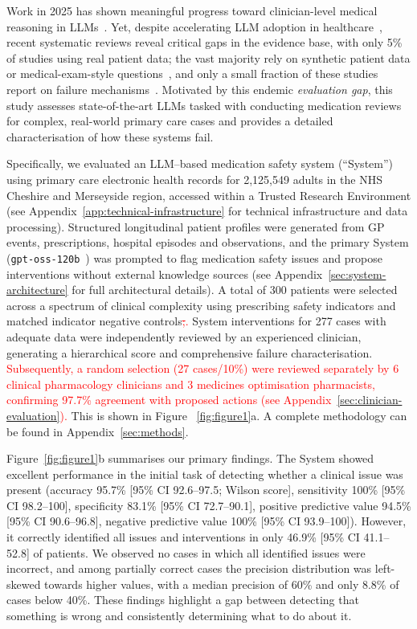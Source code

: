 \documentclass[12pt]{article}
\newcommand{\added}[1]{\textcolor{red}{#1}}
\newcommand{\removed}[1]{\textcolor{red}{\sout{#1}}}
\begin{document}
Work in 2025 has shown meaningful progress toward clinician-level medical reasoning in LLMs~\cite{Tu2025AMIE,Arora2025HealthBench, Chen2025GPT4}. Yet, despite accelerating LLM adoption in healthcare~\cite{elsevier_clinician_future_2025}, recent systematic reviews reveal critical gaps in the evidence base, with only 5\% of studies using real patient data; the vast majority rely on synthetic patient data or medical-exam-style questions~\cite{suhana2025, ong2025scoping}, and only a small fraction of these studies report on failure mechanisms~\cite{asgari_framework_2025}. Motivated by this endemic \textit{evaluation gap}, this study assesses state-of-the-art LLMs tasked with conducting medication reviews for complex, real-world primary care cases and provides a detailed characterisation of how these systems fail.

Specifically, we evaluated an LLM–based medication safety system (“System”) using primary care electronic health records for 2,125,549 adults in the NHS Cheshire and Merseyside region, accessed within a Trusted Research Environment (see Appendix~\ref{app:technical-infrastructure} for technical infrastructure and data processing). Structured longitudinal patient profiles were generated from GP events, prescriptions, hospital episodes and observations, and the primary System (\texttt{gpt-oss-120b}~\cite{gpt-oss}) was prompted to flag medication safety issues and propose interventions without external knowledge sources (see Appendix~\ref{sec:system-architecture} for full architectural details). A total of 300 patients were selected across a spectrum of clinical complexity using prescribing safety indicators and matched indicator negative controls\removed{;}\added{.} System interventions for 277 cases with adequate data were independently reviewed by an experienced clinician, generating a hierarchical score and comprehensive failure characterisation. \added{Subsequently, a random selection (27 cases/10\%) were reviewed separately by 6 clinical pharmacology clinicians and 3 medicines optimisation pharmacists, confirming 97.7\% agreement with proposed actions (see Appendix~\ref{sec:clinician-evaluation}).} This is shown in Figure ~\ref{fig:figure1}a. A complete methodology can be found in Appendix~\ref{sec:methods}.

Figure~\ref{fig:figure1}b summarises our primary findings. The System showed excellent performance in the initial task of detecting whether a clinical issue was present (accuracy 95.7\% [95\% CI 92.6--97.5; Wilson score], sensitivity 100\% [95\% CI 98.2--100], specificity 83.1\% [95\% CI 72.7--90.1], positive predictive value 94.5\% [95\% CI 90.6--96.8], negative predictive value 100\% [95\% CI 93.9--100]). However, it correctly identified all issues and interventions in only 46.9\% [95\% CI 41.1--52.8] of patients. We observed no cases in which all identified issues were incorrect, and among partially correct cases the precision distribution was left-skewed towards higher values, with a median precision of 60\% and only 8.8\% of cases below 40\%. These findings highlight a gap between detecting that something is wrong and consistently determining what to do about it.
\end{document}
